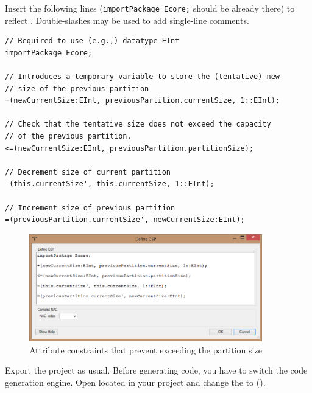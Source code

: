 \begin{stepbystep}
\item Insert the following lines (\texttt{importPackage Ecore;} should be already there) to reflect .
Double-slashes may be used to add single-line comments.
\begin{verbatim}
// Required to use (e.g.,) datatype EInt
importPackage Ecore;

// Introduces a temporary variable to store the (tentative) new
// size of the previous partition
+(newCurrentSize:EInt, previousPartition.currentSize, 1::EInt);

// Check that the tentative size does not exceed the capacity
// of the previous partition.
<=(newCurrentSize:EInt, previousPartition.partitionSize);

// Decrement size of current partition
-(this.currentSize', this.currentSize, 1::EInt);

// Increment size of previous partition
=(previousPartition.currentSize', newCurrentSize:EInt);
\end{verbatim}
%
\begin{figure}[htbp]
    \begin{center}
        \includegraphics[width=0.9\textwidth]{../../org.moflon.doc.handbook.03_storyDiagrams/13_complexAttributeConstraints/visCACImages/ea_CAC_DefineCSP}
        \caption{Attribute constraints that prevent exceeding the partition size}  
        \label{ea:ea_CAC_DefineCSP}
    \end{center}
\end{figure}
% 
\item
Export the project as usual. 
Before generating code, you have to switch the code generation engine.
Open  located in your project and change the  to   ().


\end{stepbystep}
